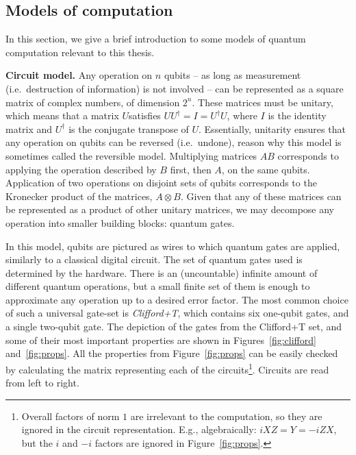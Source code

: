\begin{itemize}
\end{itemize}


\subsection{Models of computation}
\label{Models}

In this section, we give a brief introduction to some models of quantum computation relevant to this thesis.

\textbf{Circuit model.} Any operation on \(n\) qubits -- as long as measurement (i.e.\ destruction of information) is not involved -- can be represented as a square matrix of complex numbers, of dimension \(2^n\). These matrices must be unitary, which means that a matrix \(U\)satisfies \(UU^\dag = I = U^\dag U\), where \(I\) is the identity matrix and \(U^\dag\) is the conjugate transpose of \(U\). Essentially, unitarity ensures that any operation on qubits can be reversed (i.e.\ undone), reason why this model is sometimes called the reversible model. Multiplying matrices \(AB\) corresponds to applying the operation described by \(B\) first, then \(A\), on the same qubits. Application of two operations on disjoint sets of qubits corresponds to the Kronecker product of the matrices, \(A \otimes B\). Given that any of these matrices can be represented as a product of other unitary matrices, we may decompose any operation into smaller building blocks: quantum gates.

In this model, qubits are pictured as wires to which quantum gates are applied, similarly to a classical digital circuit. The set of quantum gates used is determined by the hardware. There is an (uncountable) infinite amount of different quantum operations, but a small finite set of them is enough to approximate any operation up to a desired error factor. The most common choice of such a universal gate-set is \textit{Clifford+T}, which contains six one-qubit gates, and a single two-qubit gate. The depiction of the gates from the Clifford+T set, and some of their most important properties are shown in Figures~\ref{fig:clifford} and~\ref{fig:props}. All the properties from Figure~\ref{fig:props} can be easily checked by calculating the matrix representing each of the circuits\footnote{Overall factors of norm \(1\) are irrelevant to the computation, so they are ignored in the circuit representation. E.g., algebraically: \(iXZ = Y = -iZX\), but the \(i\) and \(-i\) factors are ignored in Figure~\ref{fig:props}.}. Circuits are read from left to right.


